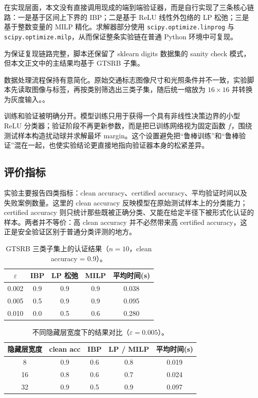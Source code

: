 \documentclass[11pt,a4paper]{ctexart}
\begin{document}
在实现层面，本文没有直接调用现成的端到端验证器，而是自行实现了三条核心链路：一是基于区间上下界的 IBP；二是基于 ReLU 线性外包络的 LP 松弛；三是基于整数变量的 MILP 精化。求解器部分使用 \texttt{scipy.optimize.linprog} 与 \texttt{scipy.optimize.milp}，从而保证整条实验链在普通 Python 环境中可复现。

为保证复现链路完整，脚本还保留了 sklearn digits 数据集的 sanity check 模式，但本文正文中的主结果均基于 GTSRB 子集。

数据处理流程保持有意简化。原始交通标志图像尺寸和光照条件并不一致，实验脚本先读取图像与标签，再按类别筛选出三类子集，随后统一缩放为 $16\times16$ 并转换为灰度输入。。

训练和验证被明确分开。模型训练只用于获得一个具有非线性决策边界的小型 ReLU 分类器；验证阶段不再更新参数，而是把已训练网络视为固定函数 $f$，围绕测试样本构造扰动球并求解最坏 margin。这个设置避免把“鲁棒训练”和“鲁棒验证”混在一起，也使实验结论更直接地指向验证器本身的松紧差异。

\subsection{评价指标}
实验主要报告四类指标：clean accuracy、certified accuracy、平均验证时间以及失败案例数量。这里的 clean accuracy 反映模型在原始测试样本上的分类能力；certified accuracy 则只统计那些既被正确分类、又能在给定半径下被形式化认证的样本。两者并不等价：高 clean accuracy 并不必然带来高 certified accuracy，这正是安全验证区别于普通分类评测的地方。

\begin{table}[H]
\centering
\caption{GTSRB 三类子集上的认证结果（$n=10$，clean accuracy = 0.9）。}
\begin{tabular}{ccccc}
\toprule
$\varepsilon$ & IBP & LP 松弛 & MILP & 平均时间(s) \\
\midrule
0.002 & 0.9 & 0.9 & 0.9 & 0.038 \\
0.005 & 0.5 & 0.9 & 0.9 & 0.095 \\
0.010 & 0.0 & 0.5 & 0.6 & 0.280 \\
\bottomrule
\end{tabular}
\label{tab:results}
\end{table}

\begin{table}[H]
\centering
\caption{不同隐藏层宽度下的结果对比（$\varepsilon=0.005$）。}
\begin{tabular}{ccccc}
\toprule
隐藏层宽度 & clean acc & IBP & LP / MILP & 平均时间(s) \\
\midrule
8 & 0.9 & 0.6 & 0.8 & 0.019 \\
16 & 0.8 & 0.6 & 0.7 & 0.024 \\
32 & 0.9 & 0.5 & 0.9 & 0.097 \\
\bottomrule
\end{tabular}
\label{tab:width}
\end{table}
\end{document}
